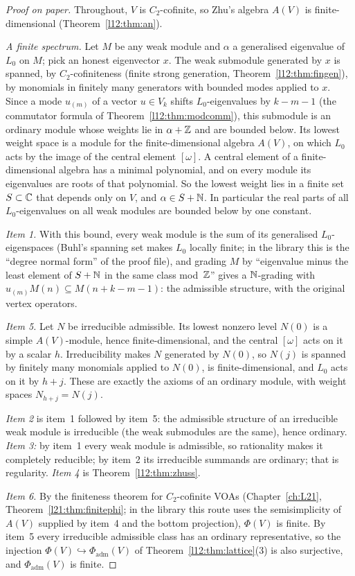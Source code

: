 \begin{proof}[Proof on paper]
Throughout, $V$ is $C_2$-cofinite, so Zhu's algebra $A(V)$ is finite-dimensional (Theorem~\ref{l12:thm:an}).

\emph{A finite spectrum.} Let $M$ be any weak module and $\alpha$ a generalised eigenvalue of $L_0$ on $M$; pick an honest
eigenvector $x$. The weak submodule generated by $x$ is spanned, by $C_2$-cofiniteness (finite strong generation,
Theorem~\ref{l12:thm:fingen}), by monomials in finitely many generators with bounded modes applied to $x$. Since a mode
$u_{(m)}$ of a vector $u\in V_k$ shifts $L_0$-eigenvalues by $k-m-1$ (the commutator formula of
Theorem~\ref{l12:thm:modcomm}), this submodule is an ordinary module whose weights lie in $\alpha+{\mathbb{Z}}$ and are bounded
below. Its lowest weight space is a module for the finite-dimensional algebra $A(V)$, on which $L_0$ acts by the image of
the central element $[\omega]$. A central element of a finite-dimensional algebra has a minimal polynomial, and on every
module its eigenvalues are roots of that polynomial. So the lowest weight lies in a finite set $S\subset{\mathbb{C}}$ that depends
only on $V$, and $\alpha\in S+{\mathbb{N}}$. In particular the real parts of all $L_0$-eigenvalues on all weak modules are bounded
below by one constant.

\emph{Item 1.} With this bound, every weak module is the sum of its generalised $L_0$-eigenspaces (Buhl's spanning set makes
$L_0$ locally finite; in the library this is the ``degree normal form'' of the proof file), and grading $M$ by ``eigenvalue minus the least element of $S+{\mathbb{N}}$ in the same class mod~${\mathbb{Z}}$'' gives a
${\mathbb{N}}$-grading with $u_{(m)}M(n)\subseteq M(n+k-m-1)$: the admissible structure, with the original vertex operators.

\emph{Item 5.} Let $N$ be irreducible admissible. Its lowest nonzero level $N(0)$ is a simple $A(V)$-module, hence
finite-dimensional, and the central $[\omega]$ acts on it by a scalar $h$. Irreducibility makes $N$ generated by $N(0)$, so
$N(j)$ is spanned by finitely many monomials applied to $N(0)$, is finite-dimensional, and $L_0$ acts on it by $h+j$. These
are exactly the axioms of an ordinary module, with weight spaces $N_{h+j}=N(j)$.

\emph{Item 2} is item~1 followed by item~5: the admissible structure of an irreducible weak module is irreducible (the weak
submodules are the same), hence ordinary. \emph{Item 3:} by item~1 every weak module is admissible, so rationality makes it
completely reducible; by item~2 its irreducible summands are ordinary; that is regularity. \emph{Item 4} is
Theorem~\ref{l12:thm:zhuss}.

\emph{Item 6.} By the finiteness theorem for $C_2$-cofinite VOAs (Chapter~\ref{ch:L21}, Theorem~\ref{l21:thm:finitephi}; in the
library this route uses the semisimplicity of $A(V)$ supplied by item~4 and the bottom projection), $\Phi(V)$ is finite. By
item~5 every irreducible admissible class has an ordinary representative, so the injection $\Phi(V)\hookrightarrow\Phi_{\mathrm{adm}}(V)$
of Theorem~\ref{l12:thm:lattice}(3) is also surjective, and $\Phi_{\mathrm{adm}}(V)$ is finite.
\end{proof}


